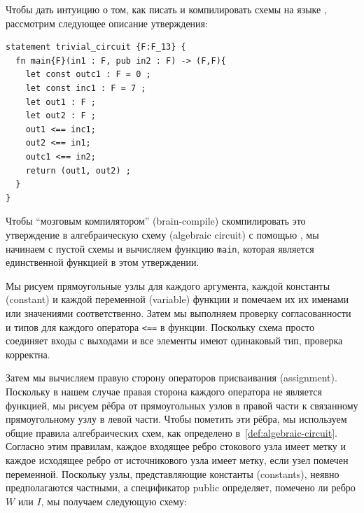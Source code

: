 \begin{example}\label{ex:trivial-circuit} Чтобы дать интуицию о том, как писать и компилировать схемы на языке , рассмотрим следующее описание утверждения:
\begin{lstlisting}
statement trivial_circuit {F:F_13} {
  fn main{F}(in1 : F, pub in2 : F) -> (F,F){
    let const outc1 : F = 0 ;   
    let const inc1 : F = 7 ;
    let out1 : F ;
    let out2 : F ;
    out1 <== inc1;
    out2 <== in1;
    outc1 <== in2;
    return (out1, out2) ;
  }
}
\end{lstlisting} 
Чтобы ``мозговым компилятором'' (brain-compile) скомпилировать это утверждение в алгебраическую схему (algebraic circuit) с помощью , мы начинаем с пустой схемы и вычисляем функцию \texttt{main}, которая является единственной функцией в этом утверждении.

Мы рисуем прямоугольные узлы для каждого аргумента, каждой константы (constant) и каждой переменной (variable) функции и помечаем их их именами или значениями соответственно. Затем мы выполняем проверку согласованности и типов для каждого оператора \texttt{<==} в функции. Поскольку схема просто соединяет входы с выходами и все элементы имеют одинаковый тип, проверка корректна.

Затем мы вычисляем правую сторону операторов присваивания (assignment). Поскольку в нашем случае правая сторона каждого оператора не является функцией, мы рисуем рёбра от прямоугольных узлов в правой части к связанному прямоугольному узлу в левой части. Чтобы пометить эти рёбра, мы используем общие правила алгебраических схем, как определено в~\ref{def:algebraic-circuit}. Согласно этим правилам, каждое входящее ребро стокового узла имеет метку и каждое исходящее ребро от источникового узла имеет метку, если узел помечен переменной. Поскольку узлы, представляющие константы (constants), неявно предполагаются частными, а спецификатор public определяет, помечено ли ребро $W$ или $I$, мы получаем следующую схему:
\begin{center}
\end{center}
\end{example}
